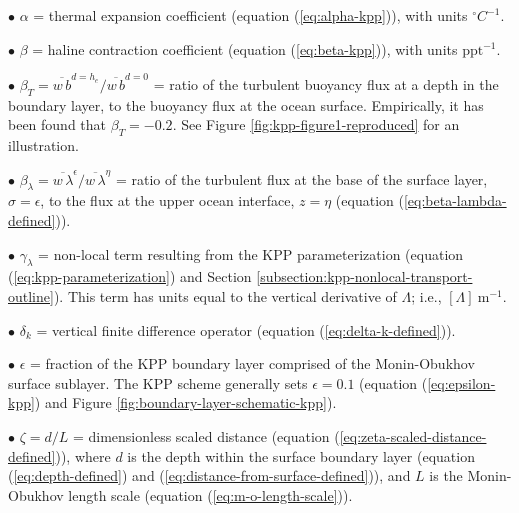 \begin{mdframed}[backgroundcolor=lightgray!50]
\vspace{.1cm}
\begin{trivlist}

\item[$\bullet$] $\alpha$ = thermal expansion coefficient (equation
  (\ref{eq:alpha-kpp})), with units $\mbox{}^{\circ}C^{-1}$.

\item[$\bullet$] $\beta$ = haline contraction coefficient (equation
  (\ref{eq:beta-kpp})), with units $\mbox{ppt}^{-1}$.

\item[$\bullet$] $\beta_{T} = \overline{w \, b}^{d=h_{e}} /
  \overline{w \, b}^{d=0}$ = ratio of the turbulent buoyancy flux at a
  depth in the boundary layer, to the buoyancy flux at the ocean
  surface.  Empirically, it has been found that $\beta_{T} = -0.2$.
  See Figure \ref{fig:kpp-figure1-reproduced} for an illustration.

\item[$\bullet$] $\beta_{\lambda} = \overline{w \,
    \lambda}^{\epsilon}/ \overline{w \, \lambda}^{\eta}$ = ratio of
  the turbulent flux at the base of the surface layer, $\sigma =
  \epsilon$, to the flux at the upper ocean interface, $z=\eta$
  (equation (\ref{eq:beta-lambda-defined})).

\item[$\bullet$] $\gamma_{\lambda}$ = non-local term resulting from the KPP
  parameterization (equation (\ref{eq:kpp-parameterization}) and
  Section \ref{subsection:kpp-nonlocal-transport-outline}).  This term
  has units equal to the vertical derivative of $\Lambda$; i.e.,
  $[\Lambda]~\mbox{m}^{-1}$.

\item[$\bullet$] $\delta_k$ = vertical finite difference operator
  (equation (\ref{eq:delta-k-defined})).

\item[$\bullet$] $\epsilon$ = fraction of the KPP boundary layer
  comprised of the Monin-Obukhov surface sublayer.  The KPP scheme
  generally sets $\epsilon=0.1$ (equation (\ref{eq:epsilon-kpp}) and
  Figure \ref{fig:boundary-layer-schematic-kpp}).

\item[$\bullet$] $\zeta = d/L$ = dimensionless scaled distance
  (equation (\ref{eq:zeta-scaled-distance-defined})), where $d$ is the
  depth within the surface boundary layer (equation
  (\ref{eq:depth-defined}) and
  (\ref{eq:distance-from-surface-defined})), and $L$ is the
  Monin-Obukhov length scale (equation (\ref{eq:m-o-length-scale})).


\end{trivlist}
\end{mdframed}

